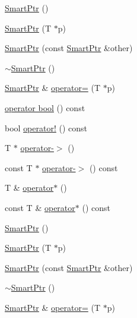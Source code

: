 \begin{DoxyCompactItemize}
\hyperlink{struct_ref_count_1_1_smart_ptr_ad074429beb571024a3e7163ea23e4549}{Smart\+Ptr} ()
\item 
\hyperlink{struct_ref_count_1_1_smart_ptr_a4dd31622ad633625198ad72b2a516780}{Smart\+Ptr} (T $\ast$p)
\item 
\hyperlink{struct_ref_count_1_1_smart_ptr_a3070abd483a035456d9ca5502fd4b3d8}{Smart\+Ptr} (const \hyperlink{struct_ref_count_1_1_smart_ptr}{Smart\+Ptr} \&other)
\item 
\hyperlink{struct_ref_count_1_1_smart_ptr_a763720e16a21250c943c72d253687ef9}{$\sim$\+Smart\+Ptr} ()
\item 
\hyperlink{struct_ref_count_1_1_smart_ptr}{Smart\+Ptr} \& \hyperlink{struct_ref_count_1_1_smart_ptr_a55b03fe0e11cf6f8ce2288a4c1b26cbe}{operator=} (T $\ast$p)
\item 
\hyperlink{struct_ref_count_1_1_smart_ptr_a2b04ce3de1a459ece3ff1085747b3b31}{operator bool} () const 
\item 
bool \hyperlink{struct_ref_count_1_1_smart_ptr_aee02f41d66900ff20a553ae80f0f2d1e}{operator!} () const 
\item 
T $\ast$ \hyperlink{struct_ref_count_1_1_smart_ptr_a66e847fc6dfbe990e47dbac08215c3be}{operator-\/$>$} ()
\item 
const T $\ast$ \hyperlink{struct_ref_count_1_1_smart_ptr_a4ae9528614812cf1072d96b36a0aad63}{operator-\/$>$} () const 
\item 
T \& \hyperlink{struct_ref_count_1_1_smart_ptr_a29dc9811bba00dbd98d1fe77a0a90adc}{operator$\ast$} ()
\item 
const T \& \hyperlink{struct_ref_count_1_1_smart_ptr_a66c0ada25b37ce1d15b242b421f253a9}{operator$\ast$} () const 
\item 
\hyperlink{struct_ref_count_1_1_smart_ptr_ad074429beb571024a3e7163ea23e4549}{Smart\+Ptr} ()
\item 
\hyperlink{struct_ref_count_1_1_smart_ptr_a4dd31622ad633625198ad72b2a516780}{Smart\+Ptr} (T $\ast$p)
\item 
\hyperlink{struct_ref_count_1_1_smart_ptr_a3070abd483a035456d9ca5502fd4b3d8}{Smart\+Ptr} (const \hyperlink{struct_ref_count_1_1_smart_ptr}{Smart\+Ptr} \&other)
\item 
\hyperlink{struct_ref_count_1_1_smart_ptr_a763720e16a21250c943c72d253687ef9}{$\sim$\+Smart\+Ptr} ()
\item 
\hyperlink{struct_ref_count_1_1_smart_ptr}{Smart\+Ptr} \& \hyperlink{struct_ref_count_1_1_smart_ptr_a55b03fe0e11cf6f8ce2288a4c1b26cbe}{operator=} (T $\ast$p)
\item 

\end{DoxyCompactItemize}
